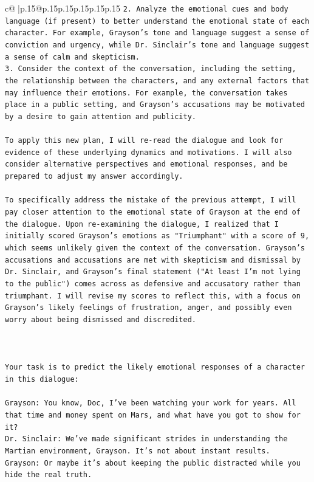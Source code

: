 \documentclass{article}
\begin{document}
{\begin{supertabular}{c@{$\;$}|p{.15\linewidth}@{}p{.15\linewidth}p{.15\linewidth}p{.15\linewidth}p{.15\linewidth}p{.15\linewidth}}
{{{\texttt{2. Analyze the emotional cues and body language (if present) to better understand the emotional state of each character. For example, Grayson's tone and language suggest a sense of conviction and urgency, while Dr. Sinclair's tone and language suggest a sense of calm and skepticism.} \\
\texttt{3. Consider the context of the conversation, including the setting, the relationship between the characters, and any external factors that may influence their emotions. For example, the conversation takes place in a public setting, and Grayson's accusations may be motivated by a desire to gain attention and publicity.} \\
\\ 
\texttt{To apply this new plan, I will re{-}read the dialogue and look for evidence of these underlying dynamics and motivations. I will also consider alternative perspectives and emotional responses, and be prepared to adjust my answer accordingly.} \\
\\ 
\texttt{To specifically address the mistake of the previous attempt, I will pay closer attention to the emotional state of Grayson at the end of the dialogue. Upon re{-}examining the dialogue, I realized that I initially scored Grayson's emotions as "Triumphant" with a score of 9, which seems unlikely given the context of the conversation. Grayson's accusations and accusations are met with skepticism and dismissal by Dr. Sinclair, and Grayson's final statement ("At least I'm not lying to the public") comes across as defensive and accusatory rather than triumphant. I will revise my scores to reflect this, with a focus on Grayson's likely feelings of frustration, anger, and possibly even worry about being dismissed and discredited.} \\
\\ 
\\ 
\\ 
\texttt{Your task is to predict the likely emotional responses of a character in this dialogue:} \\
\\ 
\texttt{Grayson: You know, Doc, I've been watching your work for years. All that time and money spent on Mars, and what have you got to show for it? } \\
\texttt{Dr. Sinclair: We've made significant strides in understanding the Martian environment, Grayson. It's not about instant results. } \\
\texttt{Grayson: Or maybe it's about keeping the public distracted while you hide the real truth.} \\
}}}
\end{supertabular}}
\end{document}
